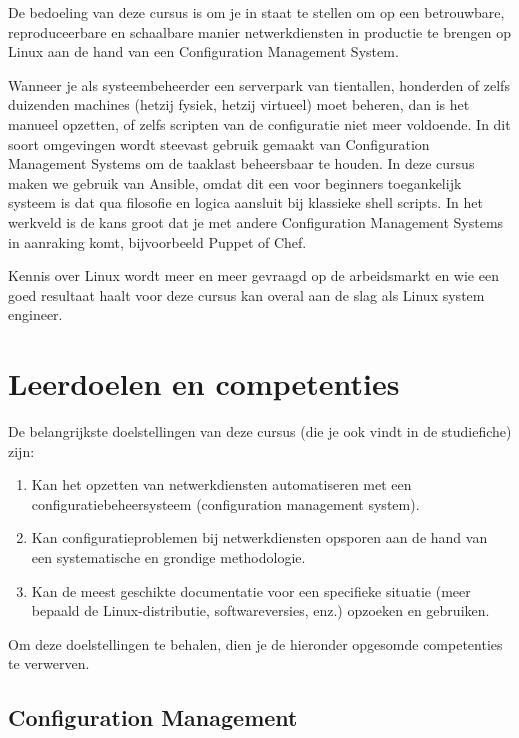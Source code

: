 De bedoeling van deze cursus is om je in staat te stellen om op een betrouwbare, reproduceerbare en schaalbare manier netwerkdiensten in productie te brengen op Linux aan de hand van een Configuration Management System.

Wanneer je als systeembeheerder een serverpark van tientallen, honderden of zelfs duizenden machines (hetzij fysiek, hetzij virtueel) moet beheren, dan is het manueel opzetten, of zelfs scripten van de configuratie niet meer voldoende. In dit soort omgevingen wordt steevast gebruik gemaakt van Configuration Management Systems om de taaklast beheersbaar te houden. In deze cursus maken we gebruik van Ansible, omdat dit een voor beginners toegankelijk systeem is dat qua filosofie en logica aansluit bij klassieke shell scripts. In het werkveld is de kans groot dat je met andere Configuration Management Systems in aanraking komt, bijvoorbeeld Puppet of Chef.

Kennis over Linux wordt meer en meer gevraagd op de arbeidsmarkt en wie een goed resultaat haalt voor deze cursus kan overal aan de slag als Linux system engineer.

\section{Leerdoelen en competenties}
\label{sec:leerdoelen}

De belangrijkste doelstellingen van deze cursus (die je ook vindt in de studiefiche) zijn:

\begin{enumerate}
  \item Kan het opzetten van netwerkdiensten automatiseren met een configuratiebeheersysteem (configuration management system).
  \item Kan configuratieproblemen bij netwerkdiensten opsporen aan de hand van een systematische en grondige methodologie.
  \item Kan de meest geschikte documentatie voor een specifieke situatie (meer bepaald de Linux-distributie, softwareversies, enz.) opzoeken en gebruiken.
\end{enumerate}

Om deze doelstellingen te behalen, dien je de hieronder opgesomde competenties te verwerven.

\subsection{Configuration Management}
\label{ssec:config-mgmt}

